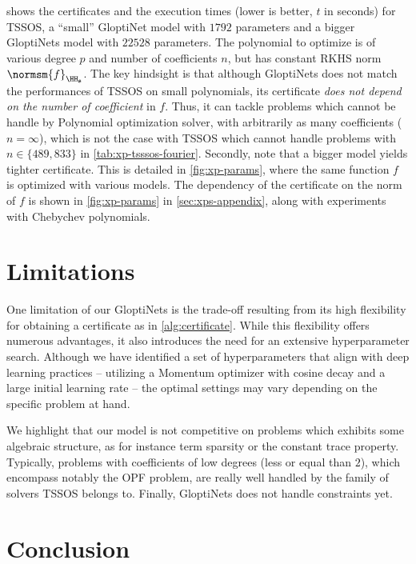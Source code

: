 \documentclass{article}
\begin{document}
 shows the certificates and the execution times (lower is better, $t$ in seconds) for TSSOS, a ``small'' GloptiNet model with $1792$ parameters and a bigger GloptiNets model with $22528$ parameters. The polynomial to optimize is of various degree $p$ and number of coefficients $n$, but has constant RKHS norm $\normsm{f}_{\HH_{\mathbf{s}}}$. The key hindsight is that although GloptiNets does not match the performances of TSSOS on small polynomials, its certificate \emph{does not depend on the number of coefficient} in $f$. Thus, it can tackle problems which cannot be handle by Polynomial optimization solver, with arbitrarily as many coefficients ($n = \infty$), which is not the case with TSSOS which cannot handle problems with $n \in \{489, 833\}$ in \cref{tab:xp-tsssos-fourier}. Secondly, note that a bigger model yields tighter certificate. This is detailed in \cref{fig:xp-params}, where the same function $f$ is optimized with various models. The dependency of the certificate on the norm of $f$ is shown in \cref{fig:xp-params} in \cref{sec:xps-appendix}, along with experiments with Chebychev polynomials.

\section{Limitations}

One limitation of our GloptiNets is the trade-off resulting from its high flexibility for obtaining a certificate as in \cref{alg:certificate}. While this flexibility offers numerous advantages, it also introduces the need for an extensive hyperparameter search. Although we have identified a set of hyperparameters that align with deep learning practices -- utilizing a Momentum optimizer with cosine decay and a large initial learning rate -- the optimal settings may vary depending on the specific problem at hand.

We highlight that our model is not competitive on problems which exhibits some algebraic structure, as for instance term sparsity or the constant trace property. Typically, problems with coefficients of low degrees (less or equal than $2$), which encompass notably the OPF problem, are really well handled by the family of solvers TSSOS belongs to. Finally, GloptiNets does not handle constraints yet.

\section{Conclusion}
\end{document}
